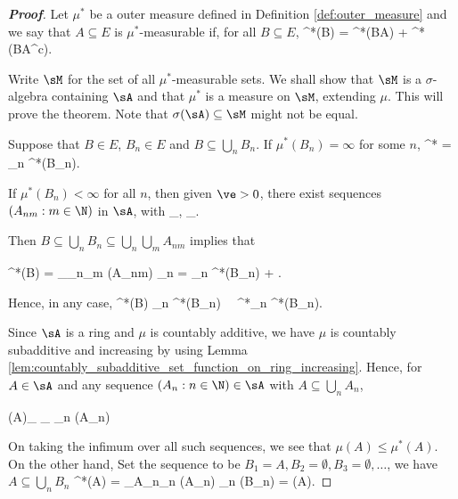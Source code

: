 \begin{proof}[\bf Proof]
Let $\mu^*$ be a outer measure defined in Definition \ref{def:outer_measure} and we say that $A\subseteq E$ is $\mu^*$-measurable if, for all $B\subseteq E$,
\be
\mu^*(B) = \mu^*(B\cap A) + \mu^*(B\cap A^c).
\ee

Write $\sM$ for the set of all $\mu^*$-measurable sets. We shall show that $\sM$ is a $\sigma$-algebra containing $\sA$ and that $\mu^*$ is a measure on $\sM$, extending $\mu$. This will prove the theorem. Note that $\sigma(\sA)\subseteq \sM$ might not be equal.

\hspace{-5.5mm}{\bf Step I. We show that $\mu^*$ is countably subadditive.} Suppose that $B\in E$, $B_n\in E$ and $B\subseteq \bigcup_n B_n$. If $\mu^*(B_n) = \infty$ for some $n$,
\be
\mu^* \leq \infty = \sum_n \mu^*(B_n).
\ee

If $\mu^*(B_n)< \infty$ for all $n$, then given $\ve>0$, there exist sequences $(A_{nm}:m\in \N)$ in $\sA$, with
\be
{}_{}, \quad\quad {}_{}.
\ee

Then $B \subseteq \bigcup_n B_n \subseteq \bigcup_n \bigcup_m A_{nm}$ implies that

\be
\mu^*(B) = _{\N\times \N {}}\leq \sum_n\sum_m \mu(A_{nm}) \leq \sum_n  = \sum_n \mu^*(B_n) + \ve.
\ee

Hence, in any case,
\be
\mu^*(B) \leq \sum_n \mu^*(B_n) \ \ra \ \mu^*\leq \sum_n \mu^*(B_n).
\ee

\hspace{-5.5mm}{\bf Step II. We show that $\mu^*$ extends $\mu$.} Since $\sA$ is a ring and $\mu$ is countably additive,  we have $\mu$ is countably subadditive and increasing by using Lemma \ref{lem:countably_subadditive_set_function_on_ring_increasing}. Hence, for $A\in \sA$ and any sequence $(A_n:n\in\N)\in \sA$ with $A\subseteq \bigcup_nA_n$,

\be
\mu(A)\underbrace{\leq}_{\mu {}} \mu{} \underbrace{\leq}_{\mu {}} \sum_n \mu(A_n)
\ee

On taking the infimum over all such sequences, we see that $\mu(A) \leq \mu^*(A)$. On the other hand, Set the sequence to be $B_1=A,B_2=\emptyset,B_3=\emptyset,\dots$, we have $A\subseteq \bigcup_n B_n$
\be
\mu^*(A) = \inf_{A_n}\sum_n \mu(A_n) \leq \sum_n \mu(B_n) = \mu(A).
\ee


\end{proof}

